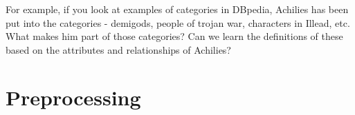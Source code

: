 \documentclass[runningheads,a4paper]{llncs}
\begin{document}
For example, if you look at examples of categories in DBpedia, Achilies has been
put into the categories - demigods, people of trojan war, characters in Illead, etc.
What makes him part of those categories? Can we learn the definitions of these
based on the attributes and relationships of Achilies?


\section{Preprocessing}



\end{document}
